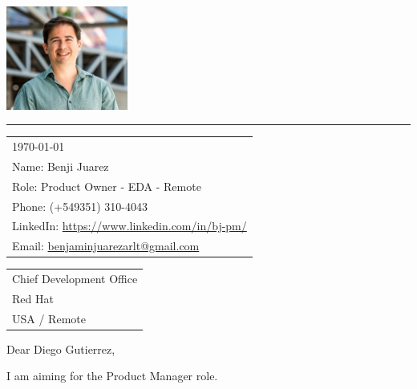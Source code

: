 \documentclass{article}
\begin{document}
\includegraphics[width=0.3\textwidth]{pic.png} %
\rule{0.72\linewidth}{1pt} %
\bigskip\bigskip %
\hfill
\begin{tabular}{l @{}} \today \midskip\\ 
	Name: Benji Juarez \\
	Role: Product Owner - EDA - Remote\\
	Phone: (+549351) 310-4043 \\
	LinkedIn: \href{https://www.linkedin.com/in/bj-pm/?locale=en_US}{https://www.linkedin.com/in/bj-pm/} \\
	Email: \href{benjaminjuarezarlt@gmail.com}{benjaminjuarezarlt@gmail.com} \\
\end{tabular}
\bigskip %

\begin{tabular}{@{} l}
    Chief Development 
    Office \\ 
    Red Hat \\ 
    USA / Remote 
\end{tabular}
\bigskip 

Dear Diego Gutierrez,

I am aiming for the 
Product Manager
role.



% 
% 
% 
\end{document}

